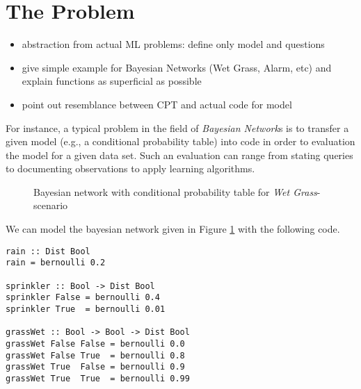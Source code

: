 \documentclass[
12pt, %
a4paper, %
oneside, %
]{llncs}
\begin{document}
\section{The Problem}

\begin{itemize}
\item abstraction from actual ML problems: define only model and
  questions
\item give simple example for Bayesian Networks (Wet Grass, Alarm,
  etc) and explain functions as superficial as possible
\item point out resemblance between CPT and actual code for model
\end{itemize}


For instance, a typical problem in the field of \emph{Bayesian
  Network}s is to transfer a given model (e.g., a conditional
probability table) into code in order to evaluation the model for a
given data set. %
Such an evaluation can range from stating queries to documenting
observations to apply learning algorithms. %

\begin{figure}
\label{fig:WetGrass}
\caption{Bayesian network with conditional probability table for
  \emph{Wet Grass}-scenario}
\end{figure}

We can model the bayesian network given in Figure \ref{fig:WetGrass} with the following code. %

\begin{verbatim}
rain :: Dist Bool
rain = bernoulli 0.2

sprinkler :: Bool -> Dist Bool
sprinkler False = bernoulli 0.4
sprinkler True  = bernoulli 0.01

grassWet :: Bool -> Bool -> Dist Bool
grassWet False False = bernoulli 0.0
grassWet False True  = bernoulli 0.8
grassWet True  False = bernoulli 0.9
grassWet True  True  = bernoulli 0.99
\end{verbatim}
\end{document}
